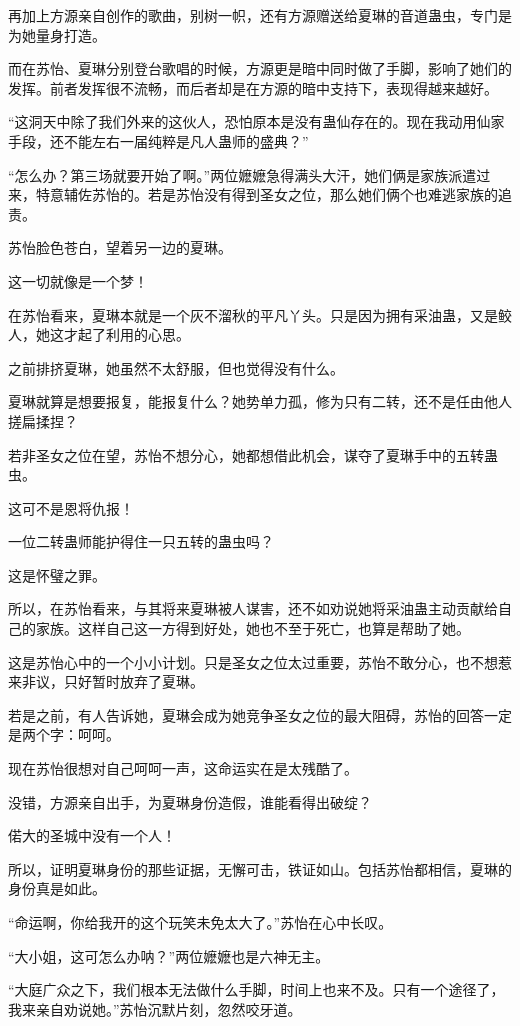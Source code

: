 \begin{this_body}
再加上方源亲自创作的歌曲，别树一帜，还有方源赠送给夏琳的音道蛊虫，专门是为她量身打造。

而在苏怡、夏琳分别登台歌唱的时候，方源更是暗中同时做了手脚，影响了她们的发挥。前者发挥很不流畅，而后者却是在方源的暗中支持下，表现得越来越好。

“这洞天中除了我们外来的这伙人，恐怕原本是没有蛊仙存在的。现在我动用仙家手段，还不能左右一届纯粹是凡人蛊师的盛典？”

“怎么办？第三场就要开始了啊。”两位嬷嬷急得满头大汗，她们俩是家族派遣过来，特意辅佐苏怡的。若是苏怡没有得到圣女之位，那么她们俩个也难逃家族的追责。

苏怡脸色苍白，望着另一边的夏琳。

这一切就像是一个梦！

在苏怡看来，夏琳本就是一个灰不溜秋的平凡丫头。只是因为拥有采油蛊，又是鲛人，她这才起了利用的心思。

之前排挤夏琳，她虽然不太舒服，但也觉得没有什么。

夏琳就算是想要报复，能报复什么？她势单力孤，修为只有二转，还不是任由他人搓扁揉捏？

若非圣女之位在望，苏怡不想分心，她都想借此机会，谋夺了夏琳手中的五转蛊虫。

这可不是恩将仇报！

一位二转蛊师能护得住一只五转的蛊虫吗？

这是怀璧之罪。

所以，在苏怡看来，与其将来夏琳被人谋害，还不如劝说她将采油蛊主动贡献给自己的家族。这样自己这一方得到好处，她也不至于死亡，也算是帮助了她。

这是苏怡心中的一个小小计划。只是圣女之位太过重要，苏怡不敢分心，也不想惹来非议，只好暂时放弃了夏琳。

若是之前，有人告诉她，夏琳会成为她竞争圣女之位的最大阻碍，苏怡的回答一定是两个字：呵呵。

现在苏怡很想对自己呵呵一声，这命运实在是太残酷了。

没错，方源亲自出手，为夏琳身份造假，谁能看得出破绽？

偌大的圣城中没有一个人！

所以，证明夏琳身份的那些证据，无懈可击，铁证如山。包括苏怡都相信，夏琳的身份真是如此。

“命运啊，你给我开的这个玩笑未免太大了。”苏怡在心中长叹。

“大小姐，这可怎么办呐？”两位嬷嬷也是六神无主。

“大庭广众之下，我们根本无法做什么手脚，时间上也来不及。只有一个途径了，我来亲自劝说她。”苏怡沉默片刻，忽然咬牙道。


\end{this_body}
